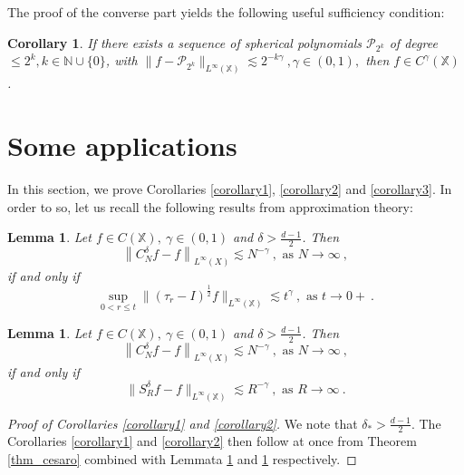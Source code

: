 \documentclass[12pt]{amsart}
\newtheorem{lemma}[theorem]{Lemma}
\newtheorem{corollary}[theorem]{Corollary}
\theoremstyle{definition}
\newcommand{\N}{\mathbb N}%
\newcommand{\X}{\mathbb X}%
\numberwithin{equation}{section}
\begin{document}
The proof of the converse part yields the following useful sufficiency condition:
\begin{corollary} \label{sufficiency_corollary}
If there exists a sequence of spherical polynomials $\mathcal{P}_{2^k}$ of degree $\le 2^k, k \in \N \cup \{0\}$, with $\|f-\mathcal{P}_{2^k}\|_{L^\infty(\X)} \lesssim 2^{-k\gamma}\:,\gamma \in (0,1),$ then $f \in C^\gamma(\X)$.
\end{corollary}


\section{Some applications}
\label{sec4}
In this section, we prove Corollaries \ref{corollary1}, \ref{corollary2} and \ref{corollary3}. In order to so, let us recall the following results from approximation theory:

\begin{lemma} \cite[Theorem 5.1]{Li} \label{Li_lemma1}
Let $f \in C(\X),\:\gamma \in (0,1)$ and $\delta>\frac{d-1}{2}$. Then 
\begin{equation*}
\left\|C^\delta_Nf-f\right\|_{L^{\infty}(X)} \lesssim N^{-\gamma}\:,\text{ as } N \to \infty\:,
\end{equation*}
if and only if 
\begin{equation*}
\sup_{0<r \le t} \|(\tau_r -I)^\frac{1}{2}f\|_{L^\infty(\X)} \lesssim t^\gamma\:,\text{ as } t \to 0+\:.
\end{equation*}
\end{lemma}

\begin{lemma} \cite[Theorem 5.2]{Li} \label{Li_lemma2}
Let $f \in C(\X),\:\gamma \in (0,1)$ and $\delta>\frac{d-1}{2}$. Then 
\begin{equation*}
\left\|C^\delta_Nf-f\right\|_{L^{\infty}(X)} \lesssim N^{-\gamma}\:,\text{ as } N \to \infty\:,
\end{equation*}
if and only if 
\begin{equation*}
\|S^\delta_Rf-f\|_{L^\infty(\X)} \lesssim R^{-\gamma}\:,\text{ as } R \to \infty\:.
\end{equation*}
\end{lemma}

\begin{proof}[Proof of Corollaries \ref{corollary1} and \ref{corollary2}] We note that $\delta_* > \frac{d-1}{2}$. The Corollaries \ref{corollary1} and \ref{corollary2} then follow at once from Theorem \ref{thm_cesaro} combined with Lemmata \ref{Li_lemma1} and \ref{Li_lemma2} respectively.
\end{proof}
\end{document}
